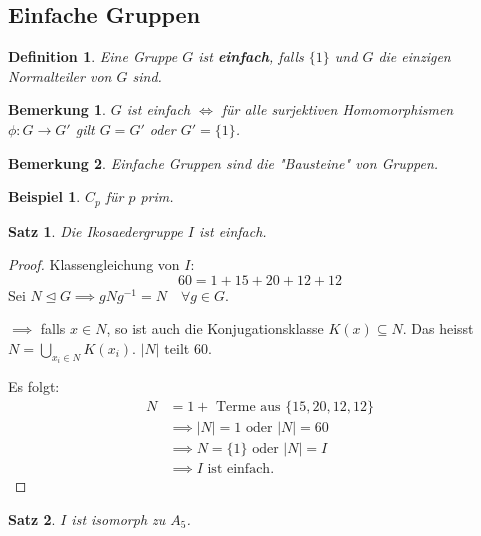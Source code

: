 \documentclass{article}
\theoremstyle{plain}
\newtheorem{definition}{Definition}
\newtheorem{theorem}{Satz}
\newtheorem{beispiel}{Beispiel}
\newtheorem{bemerkung}{Bemerkung}
\newcommand{\defn}[1]{\textbf{#1}}
\newcommand{\normal}{\trianglelefteq}
\begin{document}
\subsection*{Einfache Gruppen}
\begin{definition}
    Eine Gruppe $G$ ist \defn{einfach}, falls $\{1\}$ und $G$ die einzigen Normalteiler von $G$ sind.
\end{definition}
\begin{bemerkung}
    $G$ ist einfach $\Leftrightarrow$ für alle surjektiven Homomorphismen $\phi\colon G\to G'$ gilt $G=G'$ oder $G'=\{1\}$.
\end{bemerkung}
\begin{bemerkung}
    Einfache Gruppen sind die "Bausteine" von Gruppen.
\end{bemerkung}
\begin{beispiel}
    $C_p$ für $p$ prim.
\end{beispiel}
\begin{theorem}
    Die Ikosaedergruppe $I$ ist einfach.
\end{theorem}
\begin{proof}
    Klassengleichung von $I$:
    $$60=1+15+20+12+12$$
    Sei $N\normal G \implies gNg^{-1}=N \quad \forall g\in G$.

    $\implies$ falls $x\in N$, so ist auch die Konjugationsklasse $K(x)\subseteq N$. Das heisst $N=\bigcup\limits_{x_i\in N}K(x_i)$. $|N|$ teilt 60.

    Es folgt:
    \begin{align*}
    N&=1+\text{ Terme aus }\{15,20,12,12\}\\
    &\implies |N|=1 \text{ oder }|N|=60\\
    &\implies N = \{1\} \text{ oder } |N|=I\\
    &\implies I \text{ ist einfach.}
    \end{align*}
\end{proof}
\begin{theorem}
    $I$ ist isomorph zu $A_5$.
\end{theorem}
\end{document}
